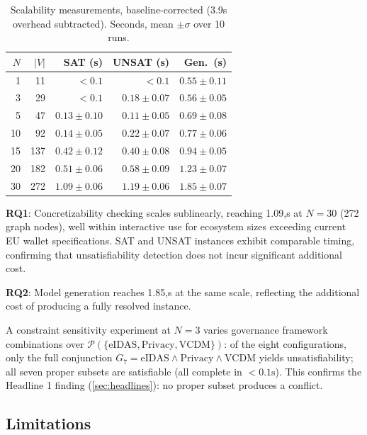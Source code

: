 \begin{table}[htb]
\caption{Scalability measurements, baseline-corrected (3.9s overhead subtracted). Seconds, mean $\pm\sigma$ over 10 runs.}
\label{tab:scalability}
\small
\begin{tabular}{rrrrr}
\toprule
$N$ & $|V|$ & SAT (s) & UNSAT (s) & Gen.\ (s) \\
\midrule
1  & 11  & ${<}0.1$          & ${<}0.1$           & $0.55 \pm 0.11$ \\
3  & 29  & ${<}0.1$          & $0.18 \pm 0.07$    & $0.56 \pm 0.05$ \\
5  & 47  & $0.13 \pm 0.10$   & $0.11 \pm 0.05$    & $0.69 \pm 0.08$ \\
10 & 92  & $0.14 \pm 0.05$   & $0.22 \pm 0.07$    & $0.77 \pm 0.06$ \\
15 & 137 & $0.42 \pm 0.12$   & $0.40 \pm 0.08$    & $0.94 \pm 0.05$ \\
20 & 182 & $0.51 \pm 0.06$   & $0.58 \pm 0.09$    & $1.23 \pm 0.07$ \\
30 & 272 & $1.09 \pm 0.06$   & $1.19 \pm 0.06$    & $1.85 \pm 0.07$ \\
\bottomrule
\end{tabular}
\end{table}

\textbf{RQ1}: Concretizability checking scales sublinearly, reaching 1.09,s at \(N{=}30\) (272 graph nodes), well within interactive use for ecosystem sizes exceeding current EU wallet specifications. SAT and UNSAT instances exhibit comparable timing, confirming that unsatisfiability detection does not incur significant additional cost.

\textbf{RQ2}: Model generation reaches 1.85,s at the same scale, reflecting the additional cost of producing a fully resolved instance.

A constraint sensitivity experiment at \(N{=}3\) varies governance framework combinations over \(\mathcal{P}(\{\text{eIDAS}, \text{Privacy}, \text{VCDM}\})\): of the eight configurations, only the full conjunction \(G_7 = \text{eIDAS} \wedge \text{Privacy} \wedge \text{VCDM}\) yields unsatisfiability; all seven proper subsets are satisfiable (all complete in \({<}0.1\text{s}\)). This confirms the Headline 1 finding (\autoref{sec:headlines}): no proper subset produces a conflict.

\subsection{Limitations}\label{sec:limitations}

